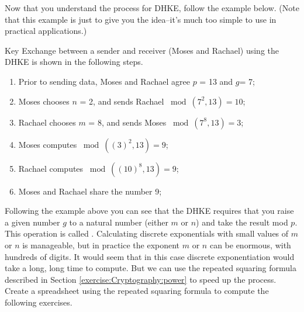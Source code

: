 Now that you understand the process for DHKE, follow the example below.  (Note that this example is just to give you the idea--it's much too simple to use in practical applications.)

 \begin{eg} Key Exchange between a sender and receiver (Moses and Rachael) using the DHKE is shown in the following steps.
\begin{enumerate}[Step 1.]
\item Prior to sending data, Moses and Rachael agree $p$ = 13 and $g$= 7; 
\item Moses chooses $n$ = 2, and sends Rachael $\bmod (7^2 , 13) = 10$;
\item Rachael chooses $m$ = 8, and sends Moses $\bmod (7^8  , 13) = 3 $;
\item Moses computes $\bmod ((3)^2 , 13 ) = 9$;
\item Rachael computes $\bmod ((10)^8 , 13 ) = 9$;
\item Moses and Rachael share the number 9;
\end{enumerate}
\end{eg}




Following the example above you can see that the DHKE requires that you raise a given number $g$ to a natural number (either $m$ or $n$) and take the result mod $p$. This operation is called . Calculating discrete exponentials with small values of $m$ or $n$ is manageable, but in practice the exponent $m$ or $n$ can be enormous, with hundreds of digits. It would seem that in this case discrete exponentiation would take a long, long time to compute.  But we can use the repeated squaring formula described in Section \ref{exercise:Cryptography:power} to speed up the process.  Create a spreadsheet using the repeated squaring formula to compute the following exercises.
 
